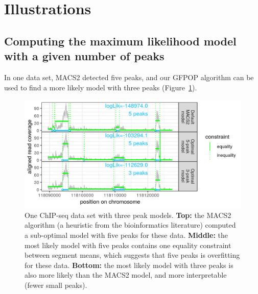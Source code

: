\documentclass[article]{jss}
\newcommand{\fct}[1]{\code{#1()}}
\begin{document}
\section{Illustrations} \label{sec:illustrations}

\subsection{Computing the maximum likelihood model with a given number
  of peaks}

In one data set, MACS2 detected five peaks, and our GFPOP
algorithm can be used to find a more likely model with three peaks
(Figure~\ref{fig:three-peaks}). 

\begin{figure}[t!]
\centering
\includegraphics{jss-figure-more-likely-models-three-peaks}
\caption{\label{fig:three-peaks} One ChIP-seq data set with three peak
  models. \textbf{Top:} the MACS2 algorithm (a heuristic from the
  bioinformatics literature) computed a sub-optimal model with five
  peaks for these data. \textbf{Middle:} the most likely model with
  five peaks contains one equality constraint between segment means,
  which suggests that five peaks is overfitting for these
  data. \textbf{Bottom:} the most likely model with three peaks is
  also more likely than the MACS2 model, and more interpretable (fewer
  small peaks).}
\end{figure}
 


\end{document}
